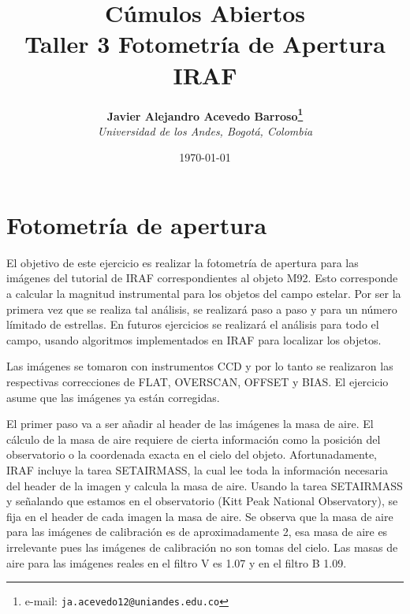 \documentclass[12pt]{article}
\begin{document}
\title{Cúmulos Abiertos \\ Taller 3 Fotometría de Apertura IRAF}

\author{
\textbf{Javier Alejandro Acevedo Barroso\thanks{e-mail: \texttt{ja.acevedo12@uniandes.edu.co}}}\\
\textit{Universidad de los Andes, Bogotá, Colombia}\\
 }%

\date{\today}
\maketitle %


\normalsize
\newpage


\section{Fotometría de apertura}
El objetivo de este ejercicio es realizar la fotometría de apertura para las imágenes del tutorial de IRAF correspondientes al objeto M92.
Esto corresponde a calcular la magnitud instrumental para los objetos del campo estelar. Por ser la primera vez que se realiza tal análisis, se realizará paso a paso y para un número límitado de estrellas.
En futuros ejercicios se realizará el análisis para todo el campo, usando algoritmos implementados en IRAF para localizar los objetos.

Las imágenes se tomaron con instrumentos CCD y por lo tanto se realizaron las respectivas correcciones de FLAT, OVERSCAN, OFFSET y BIAS. El ejercicio asume que las imágenes ya están corregidas.


El primer paso va a ser añadir al header de las imágenes la masa de aire. El cálculo de la masa de aire requiere de cierta información como la posición del observatorio o la coordenada exacta en el cielo del objeto. Afortunadamente, IRAF incluye la tarea SETAIRMASS, la cual lee toda la información necesaria del header de la imagen y calcula la masa de aire. Usando la tarea SETAIRMASS y señalando que estamos en el observatorio  (Kitt Peak National Observatory), se fija en el header de cada imagen la masa de aire. Se observa que la masa de aire para las imágenes de calibración es de aproximadamente 2, esa masa de aire es irrelevante pues las imágenes de calibración no son tomas del cielo. Las masas de aire para las imágenes reales en el filtro V es 1.07 y en el filtro B 1.09.
\end{document}
